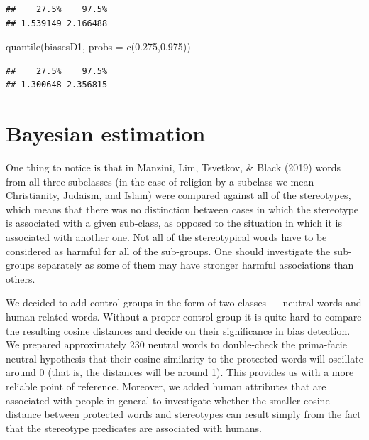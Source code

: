 \documentclass[
  10pt,
  dvipsnames,enabledeprecatedfontcommands]{scrartcl}
\newenvironment{Shaded}{\begin{snugshade}}{\end{snugshade}}
\newcommand{\AttributeTok}[1]{\textcolor[rgb]{0.77,0.63,0.00}{#1}}
\newcommand{\FloatTok}[1]{\textcolor[rgb]{0.00,0.00,0.81}{#1}}
\newcommand{\FunctionTok}[1]{\textcolor[rgb]{0.00,0.00,0.00}{#1}}
\newcommand{\NormalTok}[1]{#1}
\begin{document}
\begin{verbatim}
##    27.5%    97.5% 
## 1.539149 2.166488
\end{verbatim}

\begin{Shaded}
\begin{Highlighting}[]
\FunctionTok{quantile}\NormalTok{(biasesD1, }\AttributeTok{probs =} \FunctionTok{c}\NormalTok{(}\FloatTok{0.275}\NormalTok{,}\FloatTok{0.975}\NormalTok{))}
\end{Highlighting}
\end{Shaded}

\begin{verbatim}
##    27.5%    97.5% 
## 1.300648 2.356815
\end{verbatim}

\normalsize

\hypertarget{bayesian-estimation}{%
\section{Bayesian estimation}\label{bayesian-estimation}}

One thing to notice is that in Manzini, Lim, Tsvetkov, \& Black (2019)
words from all three subclasses (in the case of religion by a subclass
we mean Christianity, Judaism, and Islam) were compared against all of
the stereotypes, which means that there was no distinction between cases
in which the stereotype is associated with a given sub-class, as opposed
to the situation in which it is associated with another one. Not all of
the stereotypical words have to be considered as harmful for all of the
sub-groups. One should investigate the sub-groups separately as some of
them may have stronger harmful associations than others.

We decided to add control groups in the form of two classes --- neutral
words and human-related words. Without a proper control group it is
quite hard to compare the resulting cosine distances and decide on their
significance in bias detection. We prepared approximately 230 neutral
words to double-check the prima-facie neutral hypothesis that their
cosine similarity to the protected words will oscillate around 0 (that
is, the distances will be around 1). This provides us with a more
reliable point of reference. Moreover, we added human attributes that
are associated with people in general to investigate whether the smaller
cosine distance between protected words and stereotypes can result
simply from the fact that the stereotype predicates are associated with
humans.
\end{document}
